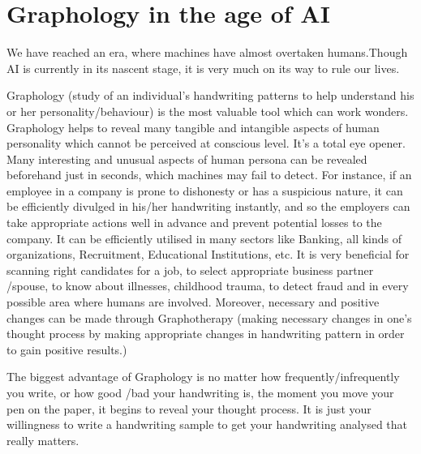 \documentclass[a4paper,10pt]{article}
\begin{document}
\section{Graphology in the age of AI}
We have reached an era, where machines have almost overtaken humans.Though AI is currently in its nascent stage, it is very much on its way to rule our lives.


Graphology (study of an individual’s handwriting patterns to help understand his or her personality/behaviour) is the most valuable tool which can work wonders. Graphology helps to reveal many tangible and intangible aspects of human personality which cannot be perceived at conscious level. It’s a total eye opener. Many interesting and unusual aspects of human persona can be revealed beforehand just in seconds, which machines may fail to detect. For instance, if an employee in a company is prone to dishonesty or has a suspicious nature, it can be efficiently divulged in his/her handwriting instantly, and so the employers can take appropriate actions well in advance and prevent potential losses to the company. It can be efficiently utilised in many sectors like Banking, all kinds of organizations, Recruitment, Educational Institutions, etc. It is very beneficial for scanning right candidates for a job, to select appropriate business partner /spouse, to know about illnesses, childhood trauma, to detect fraud and in every possible area where humans are involved. Moreover, necessary and positive changes can be made through Graphotherapy (making necessary changes in one’s thought process by making appropriate changes in handwriting pattern in order to gain positive results.)


The biggest advantage of Graphology is no matter how frequently/infrequently you write, or how good /bad your handwriting is, the moment you move your pen on the paper, it begins to reveal your thought process. It is just your willingness to write a handwriting sample to get your handwriting analysed that really matters.
\end{document}

